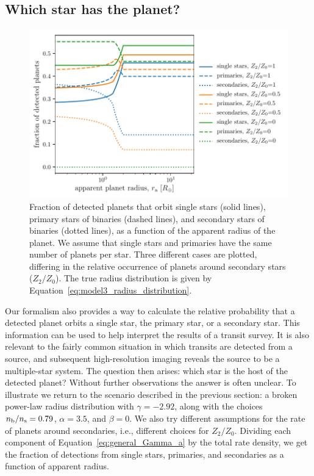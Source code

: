 \documentclass[12pt,modern]{aastex61}
\newcommand{\s}{_{\rm s}}
\renewcommand{\b}{_{\rm b}}
\begin{document}
\subsection{Which star has the planet?}
\label{subsec:whichstar}
\begin{figure}[!t]
    \centering
    \includegraphics[width=\textwidth]{figures/f5.pdf}
    \caption{ Fraction of detected planets that orbit single stars
      (solid lines), primary stars of binaries (dashed lines), and
      secondary stars of binaries (dotted lines), as a function of the
      apparent radius of the planet.  We assume that single stars and
      primaries have the same number of planets per star.  Three
      different cases are plotted, differing in the relative
      occurrence of planets around secondary stars ($Z_2/Z_0$).  The
      true radius distribution is given by
      Equation~\ref{eq:model3_radius_distribution}.}
    \label{fig:frac_model_3}
\end{figure}

Our formalism also provides a way to calculate the relative
probability that a detected planet orbits a single star, the primary
star, or a secondary star.  This information can be used to help
interpret the results of a transit survey.  It is also relevant to the
fairly common situation in which transits are detected from a source,
and subsequent high-resolution imaging reveals the source to be a
multiple-star system.  The question then arises: which star is the
host of the detected planet?  Without further observations the answer
is often unclear.  To illustrate we return to the scenario described
in the previous section: a broken power-law radius distribution with
$\gamma=-2.92$, along with the choices $n\b/n\s=0.79$, $\alpha = 3.5$,
and $\beta=0$.  We also try different assumptions for the rate of
planets around secondaries, i.e., different choices for $Z_2/Z_0$.
Dividing each component of Equation~\ref{eq:general_Gamma_a} by the
total rate density, we get the fraction of detections from single
stars, primaries, and secondaries as a function of apparent radius.
\end{document}
